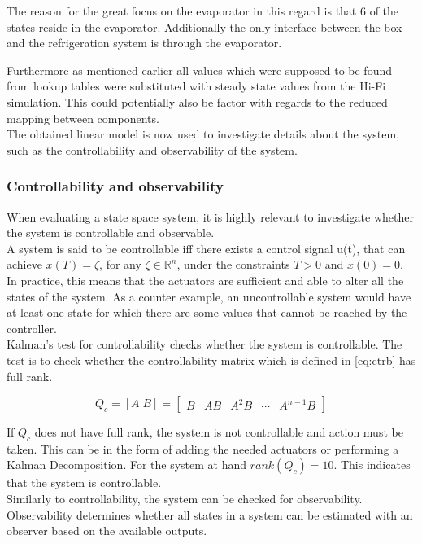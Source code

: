 The reason for the great focus on the evaporator in this regard is that 6 of the states reside in the evaporator. Additionally the only interface between the box and the refrigeration system is through the evaporator.

Furthermore as mentioned earlier all values which were supposed to be found from lookup tables were substituted with steady state values from the Hi-Fi simulation. This could potentially also be factor with regards to the reduced mapping between components.\\

The obtained linear model is now used to investigate details about the system, such as the controllability and observability of the system.


\subsubsection{Controllability and observability}
When evaluating a state space system, it is highly relevant to investigate whether the system is controllable and observable. \\
A system is said to be controllable iff there exists a control signal u(t), that can achieve $x(T) = \zeta$, for any $\zeta \in \mathbb{R} ^{n}$, under the constraints $T>0$ and $x(0)=0$. In practice, this means that the actuators are sufficient and able to alter all the states of the system. As a counter example, an uncontrollable system would have at least one state for which there are some values that cannot be reached by the controller.\\
Kalman's test for controllability checks whether the system is controllable. The test is to check whether the controllability matrix which is defined in \cref{eq:ctrb} has full rank.

\begin{equation} \label{eq:ctrb}
	Q_c = [A|B] = \begin{bmatrix}  B & AB & A^2B & \cdots & A^{n-1}B  \end{bmatrix}
\end{equation}

If $Q_c$ does not have full rank, the system is not controllable and action must be taken. This can be in the form of adding the needed actuators or performing a Kalman Decomposition. For the system at hand $ rank(Q_c) = 10 $. This indicates that the system is controllable.\\

Similarly to controllability, the system can be checked for observability. Observability determines whether all states in a system can be estimated with an observer based on the available outputs.

